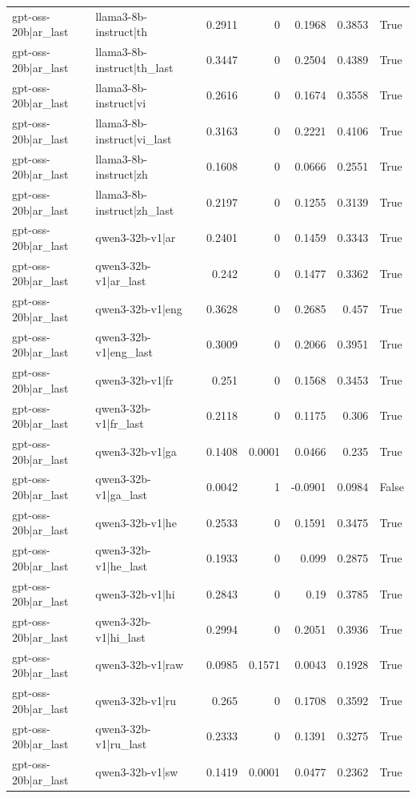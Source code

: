 \begin{table}
\begin{tabular}{l l r r r r l}
gpt-oss-20b|ar_last & llama3-8b-instruct|th & 0.2911 & 0 & 0.1968 & 0.3853 & True \\
gpt-oss-20b|ar_last & llama3-8b-instruct|th_last & 0.3447 & 0 & 0.2504 & 0.4389 & True \\
gpt-oss-20b|ar_last & llama3-8b-instruct|vi & 0.2616 & 0 & 0.1674 & 0.3558 & True \\
gpt-oss-20b|ar_last & llama3-8b-instruct|vi_last & 0.3163 & 0 & 0.2221 & 0.4106 & True \\
gpt-oss-20b|ar_last & llama3-8b-instruct|zh & 0.1608 & 0 & 0.0666 & 0.2551 & True \\
gpt-oss-20b|ar_last & llama3-8b-instruct|zh_last & 0.2197 & 0 & 0.1255 & 0.3139 & True \\
gpt-oss-20b|ar_last & qwen3-32b-v1|ar & 0.2401 & 0 & 0.1459 & 0.3343 & True \\
gpt-oss-20b|ar_last & qwen3-32b-v1|ar_last & 0.242 & 0 & 0.1477 & 0.3362 & True \\
gpt-oss-20b|ar_last & qwen3-32b-v1|eng & 0.3628 & 0 & 0.2685 & 0.457 & True \\
gpt-oss-20b|ar_last & qwen3-32b-v1|eng_last & 0.3009 & 0 & 0.2066 & 0.3951 & True \\
gpt-oss-20b|ar_last & qwen3-32b-v1|fr & 0.251 & 0 & 0.1568 & 0.3453 & True \\
gpt-oss-20b|ar_last & qwen3-32b-v1|fr_last & 0.2118 & 0 & 0.1175 & 0.306 & True \\
gpt-oss-20b|ar_last & qwen3-32b-v1|ga & 0.1408 & 0.0001 & 0.0466 & 0.235 & True \\
gpt-oss-20b|ar_last & qwen3-32b-v1|ga_last & 0.0042 & 1 & -0.0901 & 0.0984 & False \\
gpt-oss-20b|ar_last & qwen3-32b-v1|he & 0.2533 & 0 & 0.1591 & 0.3475 & True \\
gpt-oss-20b|ar_last & qwen3-32b-v1|he_last & 0.1933 & 0 & 0.099 & 0.2875 & True \\
gpt-oss-20b|ar_last & qwen3-32b-v1|hi & 0.2843 & 0 & 0.19 & 0.3785 & True \\
gpt-oss-20b|ar_last & qwen3-32b-v1|hi_last & 0.2994 & 0 & 0.2051 & 0.3936 & True \\
gpt-oss-20b|ar_last & qwen3-32b-v1|raw & 0.0985 & 0.1571 & 0.0043 & 0.1928 & True \\
gpt-oss-20b|ar_last & qwen3-32b-v1|ru & 0.265 & 0 & 0.1708 & 0.3592 & True \\
gpt-oss-20b|ar_last & qwen3-32b-v1|ru_last & 0.2333 & 0 & 0.1391 & 0.3275 & True \\
gpt-oss-20b|ar_last & qwen3-32b-v1|sw & 0.1419 & 0.0001 & 0.0477 & 0.2362 & True \\

\end{tabular}
\end{table}
